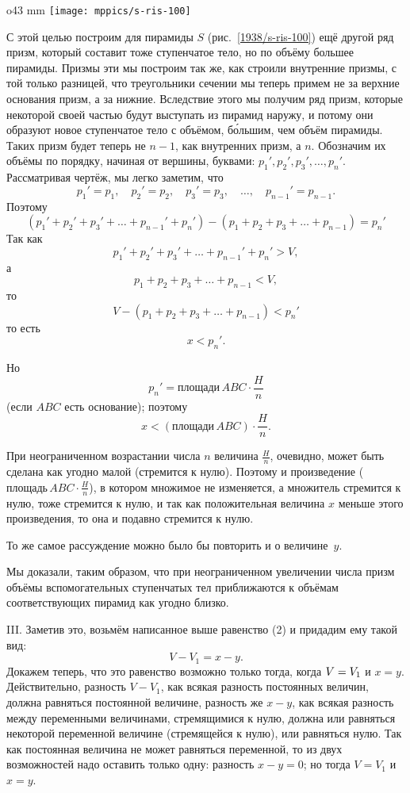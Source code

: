 \begin{wrapfigure}{o}{43 mm}
\vskip-0mm
\centering
\texttt{[image: mppics/s-ris-100]}
\caption{}\label{1938/s-ris-100}
\vskip-0mm
\end{wrapfigure}

С этой целью построим для пирамиды $S$ (рис.~\ref{1938/s-ris-100}) ещё другой ряд призм, который составит тоже ступенчатое тело, но по объёму большее пирамиды.
Призмы эти мы построим так же, как строили внутренние призмы, с той только разницей, что треугольники сечении мы теперь примем не за верхние основания призм, а за нижние.
Вследствие этого мы получим ряд призм, которые некоторой своей частью будут выступать из пирамид наружу, и потому они образуют новое ступенчатое тело с объёмом, б\'{о}льшим, чем объём пирамиды.
Таких призм будет теперь не $n-1$, как внутренних призм, а $n$.
Обозначим их объёмы по порядку, начиная от вершины, буквами: $p_1',p_2',p_3',\dots,p_n'$.
Рассматривая чертёж, мы легко заметим, что
\[p_1'=p_1,\quad p_2'=p_2,\quad p_3'=p_3,\quad\dots, \quad p_{n-1}'=p_{n-1}.\]
Поэтому
\[(p_1'+p_2'+p_3'+\dots+p_{n-1}'+p_n')-(p_1+p_2+p_3+\dots+p_{n-1})=p_n'\]
Так как
\[p_1'+p_2'+p_3'+\dots+p_{n-1}'+p_n'>V,\]
а
\[p_1+p_2+p_3+\dots+p_{n-1}<V,\]
то
\[V-(p_1+p_2+p_3+\dots+p_{n-1})<p_n'\]
то есть
\[x<p_n'.\]

Но 
\[p_n'=\text{площади}\, ABC\cdot \frac Hn\]
(если $ABC$ есть основание); поэтому
\[x<(\text{площади}\, ABC)\cdot \frac Hn.\]

При неограниченном возрастании числа $n$ величина $\frac Hn$, очевидно, может быть сделана как угодно малой (стремится к нулю).
Поэтому и произведение ($\text{площадь}\, ABC\cdot \frac Hn$), в котором множимое не изменяется, а множитель стремится к нулю, тоже стремится к нулю, и так как положительная величина $x$ меньше этого произведения, то она и подавно стремится к нулю.

То же самое рассуждение можно было бы повторить и о величине~$y$.

Мы доказали, таким образом, что при неограниченном увеличении числа призм объёмы вспомогательных ступенчатых тел приближаются к объёмам соответствующих пирамид как угодно близко.

III.
Заметив это, возьмём написанное выше равенство (2) и придадим ему такой вид: 
\[V - V_1 = x - y.\]
Докажем теперь, что это равенство возможно только тогда, когда $V\z=V_1$ и $x=y$.
Действительно, разность $V-V_1$, как всякая разность постоянных величин, должна равняться постоянной величине, разность же $x-y$, как всякая разность между переменными величинами, стремящимися к нулю, должна или равняться некоторой переменной величине (стремящейся к нулю), или равняться нулю.
Так как постоянная величина не может равняться переменной, то из двух возможностей надо оставить только одну: разность $x-y=0$;
но тогда $V=V_1$ и $x=y$.

